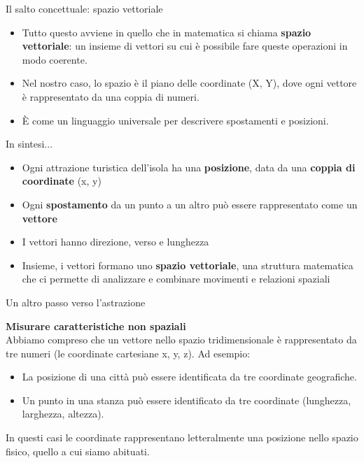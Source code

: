 \documentclass[aspectratio=169]{beamer}
\begin{document}
%
%
\begin{frame}{Il salto concettuale: spazio vettoriale}

\begin{itemize}
\item Tutto questo avviene in quello che in matematica si chiama \textbf{spazio vettoriale}: un insieme di vettori su cui è possibile fare queste operazioni in modo coerente.
\item Nel nostro caso, lo spazio è il piano delle coordinate (X, Y), dove ogni vettore è rappresentato da una coppia di numeri. 
\item È come un linguaggio universale per descrivere spostamenti e posizioni.
\end{itemize}
\end{frame}
%
%
\begin{frame}{In sintesi...}
\begin{itemize}
\item Ogni attrazione turistica dell'isola ha una \textbf{posizione}, data da una \textbf{coppia di coordinate} (x, y)
\item Ogni \textbf{spostamento} da un punto a un altro può essere rappresentato come un \textbf{vettore}
\item I vettori hanno direzione, verso e lunghezza
\item Insieme, i vettori formano uno \textbf{spazio vettoriale}, una struttura matematica che ci permette di analizzare e combinare movimenti e relazioni spaziali
\end{itemize}
\end{frame}
%
%
\begin{frame}{Un altro passo verso l'astrazione}

\textbf{Misurare caratteristiche non spaziali}\\
\vspace{.5cm}
Abbiamo compreso che un vettore nello spazio tridimensionale è rappresentato da tre numeri (le coordinate cartesiane x, y, z). Ad esempio:
\begin{itemize}
\item La posizione di una città può essere identificata da tre coordinate geografiche.
\item Un punto in una stanza può essere identificato da tre coordinate (lunghezza, larghezza, altezza).
\end{itemize}

In questi casi le coordinate rappresentano letteralmente una posizione nello spazio fisico, quello a cui siamo abituati.

\end{frame}
\end{document}
